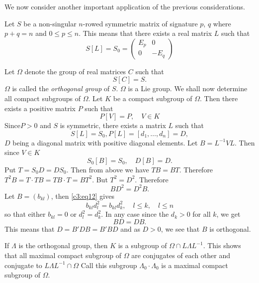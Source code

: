 We now consider another important application of the previous
considerations.

Let $S$ be a non-singular $n$-rowed symmetric matrix of signature $p$,
$q$ where $p+q=n$ and $0\leq p\leq n$. This means that there exists a
real matrix $L$ such that
\begin{equation*}
S[L]=S_{0}=
\begin{pmatrix}
E_{p} & 0\\
0 & -E_{q}
\end{pmatrix}\tag{8}\label{c3:eq8}
\end{equation*}

Let $\Omega$ denote the group of real matrices $C$ such that
\begin{equation*}
S[C]=S.\tag{9}\label{c3:eq9}
\end{equation*}
$\Omega$ is called the {\em orthogonal group} of $S$. $\Omega$ is a
Lie group. We shall now determine all compact subgroups of
$\Omega$. Let $K$ be a compact subgroup of $\Omega$. Then there exists
a positive matrix $P$ such that
\begin{equation*}
P[V]=P,\quad V\in K\tag{10}\label{c3:eq10}
\end{equation*}
Since\pageoriginale $P>0$ and $S$ is symmetric, there exists a matrix
$L$ such that
\begin{equation*}
S[L]=S_{0}, P[L]=[d_{1},\ldots,d_{n}]=D,\tag{11}\label{c3:eq11}
\end{equation*}
$D$ being a diagonal matrix with positive diagonal elements. Let
$B=L^{-1}VL$. Then since $V\in K$
$$
S_{0}[B]=S_{0},\quad D[B]=D.
$$
Put $T=S_{0}D=DS_{0}$. Then from above we have $TB=BT$. Therefore
$T^{2}B=T\cdot TB=TB\cdot T=BT^{2}$. But $T^{2}=D^{2}$. Therefore
\begin{equation*}
BD^{2}=D^{2}B.\tag{12}\label{c3:eq12}
\end{equation*}
Let $B=(b_{kl})$, then \eqref{c3:eq12} gives
\begin{equation*}
b_{kl}d^{2}_{l}=b_{kl}d^{2}_{k},\quad l\leq k,\quad l\leq n\tag{13}\label{c3:eq13}
\end{equation*}
so that either $b_{kl}=0$ or $d^{2}_{l}=d^{2}_{k}$. In any case since
the $d_{k}>0$ for all $k$, we get
$$
BD=DB.
$$
This means that $D=B'DB=B'BD$ and as $D>0$, we see that $B$ is
orthogonal.

If $\Lambda$ is the orthogonal group, then $K$ is a subgroup of
$\Omega\cap L\Lambda L^{-1}$. This shows that all maximal compact
subgroup of $\Omega$ are conjugates of each other and conjugate to
$L\Lambda L^{-1}\cap \Omega$ Call this subgroup $\Lambda_{0}\cdot
\Lambda_{0}$ is a maximal compact subgroup of $\Omega$.


